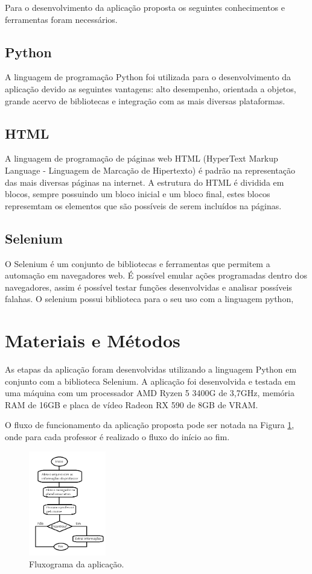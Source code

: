 \documentclass[conference]{IEEEtran}
\begin{document}
Para o desenvolvimento da aplicação proposta os seguintes conhecimentos e ferramentas foram necessários.

\subsection{Python}

A linguagem de programação Python foi utilizada para o desenvolvimento da aplicação devido as seguintes vantagens: alto desempenho, orientada a objetos, grande acervo de bibliotecas e integração com as mais diversas plataformas.

\subsection{HTML}
A linguagem de programação de páginas web HTML (HyperText Markup Language - Linguagem de Marcação de Hipertexto) é padrão na representação das mais diversas páginas na internet. A estrutura do HTML é dividida em blocos, sempre possuindo um bloco inicial e um bloco final, estes blocos represemtam os elementos que são possíveis de serem incluídos na páginas.

\subsection{Selenium}
O Selenium é um conjunto de bibliotecas e ferramentas que permitem a automação em navegadores web. É possível emular ações programadas dentro dos navegadores, assim é possível testar funções desenvolvidas e analisar possíveis falahas. O selenium possui biblioteca para o seu uso com a linguagem python, 


\section{Materiais e Métodos}\label{AA}
As etapas da aplicação foram desenvolvidas utilizando a linguagem Python em conjunto com a biblioteca Selenium. A aplicação foi desenvolvida e testada em uma máquina com um processador AMD Ryzen 5 3400G de 3,7GHz, memória RAM de 16GB e placa de vídeo Radeon RX 590 de 8GB de VRAM.

O fluxo de funcionamento da aplicação proposta pode ser notada na Figura \ref{fluxo}, onde para cada professor é realizado o fluxo do início ao fim.

\begin{figure}[htbp]
\centerline{\includegraphics[width=0.3\textwidth]{fluxo.png}}
\caption{Fluxograma da aplicação.}
\label{fluxo}
\end{figure}
\end{document}
